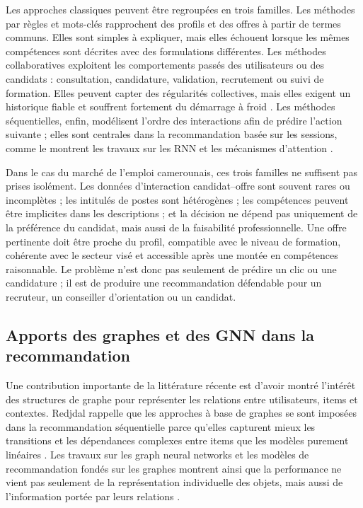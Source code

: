 \documentclass[12pt,twoside]{report}
\begin{document}
Les approches classiques peuvent être regroupées en trois familles. Les méthodes par règles et mots-clés rapprochent des profils et des offres à partir de termes communs. Elles sont simples à expliquer, mais elles échouent lorsque les mêmes compétences sont décrites avec des formulations différentes. Les méthodes collaboratives exploitent les comportements passés des utilisateurs ou des candidats : consultation, candidature, validation, recrutement ou suivi de formation. Elles peuvent capter des régularités collectives, mais elles exigent un historique fiable et souffrent fortement du démarrage à froid \cite{koren2009matrix}. Les méthodes séquentielles, enfin, modélisent l'ordre des interactions afin de prédire l'action suivante ; elles sont centrales dans la recommandation basée sur les sessions, comme le montrent les travaux sur les RNN et les mécanismes d'attention \cite{hidasi2015session,li2017narm}.

Dans le cas du marché de l'emploi camerounais, ces trois familles ne suffisent pas prises isolément. Les données d'interaction candidat--offre sont souvent rares ou incomplètes ; les intitulés de postes sont hétérogènes ; les compétences peuvent être implicites dans les descriptions ; et la décision ne dépend pas uniquement de la préférence du candidat, mais aussi de la faisabilité professionnelle. Une offre pertinente doit être proche du profil, compatible avec le niveau de formation, cohérente avec le secteur visé et accessible après une montée en compétences raisonnable. Le problème n'est donc pas seulement de prédire un clic ou une candidature ; il est de produire une recommandation défendable pour un recruteur, un conseiller d'orientation ou un candidat.

\subsection{Apports des graphes et des GNN dans la recommandation}
Une contribution importante de la littérature récente est d'avoir montré l'intérêt des structures de graphe pour représenter les relations entre utilisateurs, items et contextes. Redjdal rappelle que les approches à base de graphes se sont imposées dans la recommandation séquentielle parce qu'elles capturent mieux les transitions et les dépendances complexes entre items que les modèles purement linéaires \cite{redjdal2024sbr}. Les travaux sur les graph neural networks et les modèles de recommandation fondés sur les graphes montrent ainsi que la performance ne vient pas seulement de la représentation individuelle des objets, mais aussi de l'information portée par leurs relations \cite{velickovic2018gat,he2020lightgcn}.
\end{document}
